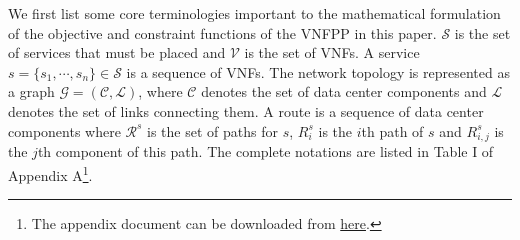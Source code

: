 We first list some core terminologies important to the mathematical formulation of the objective and constraint functions of the VNFPP in this paper. $\mathcal{S}$ is the set of services that must be placed and $\mathcal{V}$ is the set of VNFs. A service $s=\{s_1,\cdots,s_n\}\in\mathcal{S}$ is a sequence of VNFs. The network topology is represented as a graph $\mathcal{G}=(\mathcal{C},\mathcal{L})$, where $\mathcal{C}$ denotes the set of data center components and $\mathcal{L}$ denotes the set of links connecting them. A route is a sequence of data center components where $\mathcal{R}^s$ is the set of paths for $s$, $R_{i}^s$ is the $i$th path of $s$ and $R_{i,j}^s$ is the $j$th component of this path. The complete notations are listed in Table I of Appendix A\footnote{The appendix document can be downloaded from \url{here}.}. %

